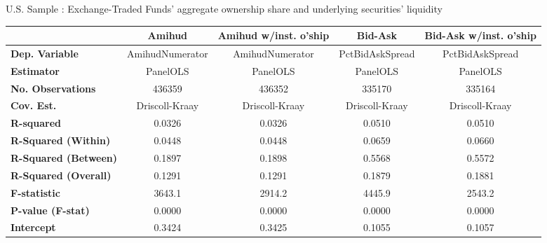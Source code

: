 \begin{center}
  \caption{U.S. Sample : Exchange-Traded Funds' aggregate ownership share and underlying securities' liquidity}
  \label{tab:Liquidity:US:Comp}
  \begin{tabular}{lcccc}
\toprule
                                           &   \textbf{Amihud}   & \textbf{Amihud w/inst. o'ship} &   \textbf{Bid-Ask}  & \textbf{Bid-Ask w/inst. o'ship}  \\
\midrule
\textbf{Dep. Variable}                     &   AmihudNumerator   &        AmihudNumerator         &   PctBidAskSpread   &         PctBidAskSpread          \\
\textbf{Estimator}                         &       PanelOLS      &            PanelOLS            &       PanelOLS      &             PanelOLS             \\
\textbf{No. Observations}                  &        436359       &             436352             &        335170       &              335164              \\
\textbf{Cov. Est.}                         &    Driscoll-Kraay   &         Driscoll-Kraay         &    Driscoll-Kraay   &          Driscoll-Kraay          \\
\textbf{R-squared}                         &        0.0326       &             0.0326             &        0.0510       &              0.0510              \\
\textbf{R-Squared (Within)}                &        0.0448       &             0.0448             &        0.0659       &              0.0660              \\
\textbf{R-Squared (Between)}               &        0.1897       &             0.1898             &        0.5568       &              0.5572              \\
\textbf{R-Squared (Overall)}               &        0.1291       &             0.1291             &        0.1879       &              0.1881              \\
\textbf{F-statistic}                       &        3643.1       &             2914.2             &        4445.9       &              2543.2              \\
\textbf{P-value (F-stat)}                  &        0.0000       &             0.0000             &        0.0000       &              0.0000              \\
\midrule
\textbf{Intercept}                         &        0.3424       &             0.3425             &        0.1055       &              0.1057              \\

\end{tabular}
\end{center}
